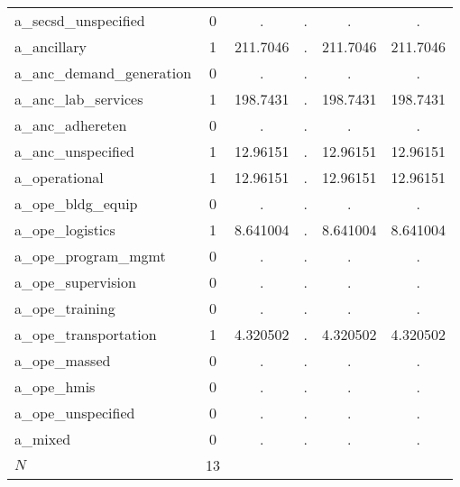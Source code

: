 \begin{table}[htbp]
\begin{tabular}{l*{1}{ccccc}}
a\_secsd\_unspecified&           0&           .&           .&           .&           .\\
a\_ancillary &           1&    211.7046&           .&    211.7046&    211.7046\\
a\_anc\_demand\_generation&           0&           .&           .&           .&           .\\
a\_anc\_lab\_services&           1&    198.7431&           .&    198.7431&    198.7431\\
a\_anc\_adhereten&           0&           .&           .&           .&           .\\
a\_anc\_unspecified&           1&    12.96151&           .&    12.96151&    12.96151\\
a\_operational&           1&    12.96151&           .&    12.96151&    12.96151\\
a\_ope\_bldg\_equip&           0&           .&           .&           .&           .\\
a\_ope\_logistics&           1&    8.641004&           .&    8.641004&    8.641004\\
a\_ope\_program\_mgmt&           0&           .&           .&           .&           .\\
a\_ope\_supervision&           0&           .&           .&           .&           .\\
a\_ope\_training&           0&           .&           .&           .&           .\\
a\_ope\_transportation&           1&    4.320502&           .&    4.320502&    4.320502\\
a\_ope\_massed&           0&           .&           .&           .&           .\\
a\_ope\_hmis  &           0&           .&           .&           .&           .\\
a\_ope\_unspecified&           0&           .&           .&           .&           .\\
a\_mixed     &           0&           .&           .&           .&           .\\
\hline
\(N\)       &          13&            &            &            &            \\
\hline\hline
\end{tabular}
\end{table}
